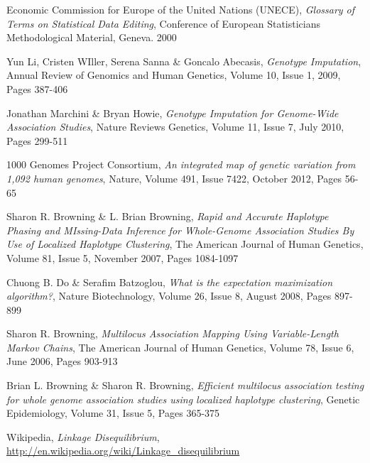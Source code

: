 \documentclass[a4paper,11pt,twoside,abstraction,titlepage]{article}
\begin{document}
\begin{thebibliography}{99}

 Economic Commission for Europe of the United Nations (UNECE), \emph{Glossary of Terms on Statistical Data Editing}, Conference of European Statisticians Methodological Material, Geneva. 2000

 Yun Li, Cristen WIller, Serena Sanna \& Goncalo Abecasis, \emph{Genotype Imputation}, Annual Review of Genomics and Human Genetics, Volume 10, Issue 1,  2009, Pages 387-406

 Jonathan Marchini \& Bryan Howie, \emph{Genotype Imputation for Genome-Wide Association Studies}, Nature Reviews Genetics, Volume 11, Issue 7, July 2010, Pages 299-511

 1000 Genomes Project Consortium, \emph{An integrated map of genetic variation from 1,092 human genomes}, Nature, Volume 491, Issue 7422, October 2012, Pages 56-65

 Sharon R. Browning \& L. Brian Browning, \emph{Rapid and Accurate Haplotype Phasing and MIssing-Data Inference for Whole-Genome Association Studies By Use of Localized Haplotype Clustering}, The American Journal of Human Genetics, Volume 81, Issue 5, November 2007, Pages 1084-1097

 Chuong B. Do \& Serafim Batzoglou, \emph{What is the expectation maximization algorithm?}, Nature Biotechnology, Volume 26, Issue 8, August 2008, Pages 897-899

 Sharon R. Browning, \emph{Multilocus Association Mapping Using Variable-Length Markov Chains}, The American Journal of Human Genetics, Volume 78, Issue 6, June 2006, Pages 903-913

 Brian L. Browning \& Sharon R. Browning, \emph{Efficient multilocus association testing for whole genome association studies using localized haplotype clustering},  Genetic Epidemiology, Volume 31, Issue 5, Pages 365-375

 Wikipedia, \emph{Linkage Disequilibrium}, \url{http://en.wikipedia.org/wiki/Linkage_disequilibrium}




\end{thebibliography}
\end{document}
